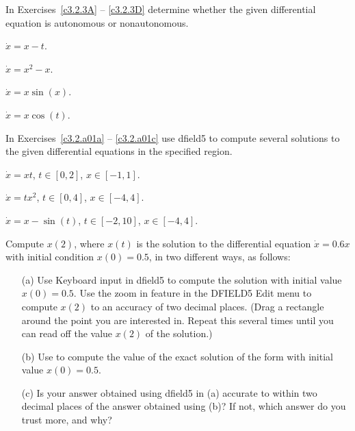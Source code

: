 \documentclass{ximera}
\begin{document}
\noindent In Exercises~\ref{c3.2.3A} -- \ref{c3.2.3D} determine whether the 
given differential equation is autonomous or nonautonomous.
\begin{exercise} \label{c3.2.3A}
$\dot{x}=x-t$.
\end{exercise}
\begin{exercise} \label{c3.2.3B}
$\dot{x}=x^2-x$.
\end{exercise}
\begin{exercise} \label{c3.2.3C}
$\dot{x}=x\sin(x)$.
\end{exercise}
\begin{exercise} \label{c3.2.3D}
$\dot{x}=x\cos(t)$.
\end{exercise}


\CEXER

\noindent In Exercises~\ref{c3.2.a01a} -- \ref{c3.2.a01c} use
{\sf dfield5} to compute several solutions to the given differential
equations in the specified region.
\begin{exercise} \label{c3.2.a01a}
$\dot{x} = xt$, $t\in[0,2]$, $x\in[-1,1]$.
\end{exercise}
\begin{exercise} \label{c3.2.a01b}
$\dot{x} = tx^2$, $t\in[0,4]$, $x\in[-4,4]$.
\end{exercise}
\begin{exercise} \label{c3.2.a01c}
$\dot{x} = x-\sin(t)$, $t\in[-2,10]$, $x\in[-4,4]$.
\end{exercise}

\begin{exercise} \label{c3.2.1*}
Compute $x(2)$, where $x(t)$ is the solution to the differential equation 
$\dot{x} = 0.6x$ with initial condition $x(0)=0.5$, in two different ways, 
as follows:
\begin{itemize}
\item[(a)] Use {\sf Keyboard input} in {\sf dfield5} to compute the 
solution with initial value $x(0)=0.5$.  Use the {\sf zoom in} feature in 
the {\sf DFIELD5 Edit} menu to compute $x(2)$ to an accuracy of two decimal 
places.  (Drag a rectangle around the point you are interested in.  Repeat 
this several times until you can read off the value $x(2)$ of the solution.)  
\item[(b)] Use \Matlab to compute the value of the exact solution
of the form  with initial value $x(0)=0.5$.  
\item[(c)] Is your answer obtained using {\sf dfield5} in (a) accurate to 
within two decimal places of the answer obtained using (b)?  If not, 
which answer do you trust more, and why?
\end{itemize}
\end{exercise}
\end{document}

